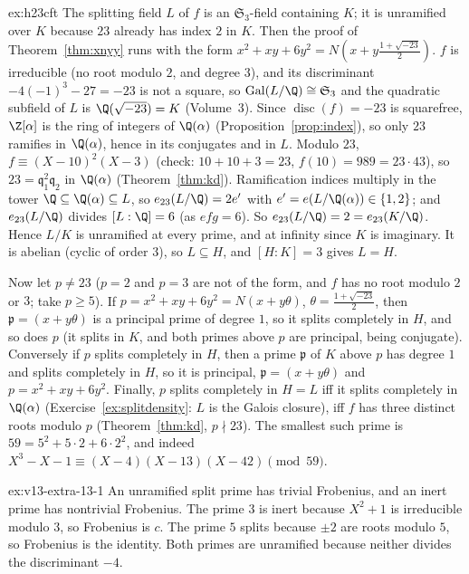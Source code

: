 \begin{solution}{ex:h23cft}
\idea The splitting field $L$ of $f$ is an $\mathfrak S_3$-field containing $K$; it is unramified over $K$ because $23$ already has index $2$ in $K$. Then the proof of
Theorem~\ref{thm:xnyy} runs with the form $x^2+xy+6y^2=N(x+y\frac{1+\sqrt{-23}}2)$.
\writeup $f$ is irreducible (no root modulo $2$, and degree $3$), and its discriminant $-4(-1)^3-27=-23$ is not a square, so $\operatorname{Gal}(L/\Q)\cong\mathfrak S_3$ and the
quadratic subfield of $L$ is $\Q(\sqrt{-23})=K$ (Volume~3). Since $\operatorname{disc}(f)=-23$ is squarefree, $\Z[\alpha]$ is the ring of integers of $\Q(\alpha)$ (Proposition~\ref{prop:index}),
so only $23$ ramifies in $\Q(\alpha)$, hence in its conjugates and in $L$. Modulo $23$, $f\equiv(X-10)^2(X-3)$ (check: $10+10+3=23$, $f(10)=989=23\cdot43$), so
$23=\mathfrak q_1^2\mathfrak q_2$ in $\Q(\alpha)$ (Theorem~\ref{thm:kd}). Ramification indices multiply in the tower $\Q\subseteq\Q(\alpha)\subseteq L$, so
$e_{23}(L/\Q)=2e'$ with $e'=e(L/\Q(\alpha))\in\{1,2\}$; and $e_{23}(L/\Q)$ divides $[L:\Q]=6$ (as $efg=6$). So $e_{23}(L/\Q)=2=e_{23}(K/\Q)$.
Hence $L/K$ is unramified at every prime, and at infinity since $K$ is imaginary. It is abelian (cyclic of order $3$), so $L\subseteq H$, and $[H:K]=3$ gives $L=H$.

Now let $p\ne23$ ($p=2$ and $p=3$ are not of the form, and $f$ has no root modulo $2$ or $3$; take $p\ge5$). If $p=x^2+xy+6y^2=N(x+y\theta)$, $\theta=\frac{1+\sqrt{-23}}2$,
then $\mathfrak p=(x+y\theta)$ is a principal prime of degree $1$, so it splits completely in $H$, and so does $p$ (it splits in $K$, and both primes above $p$ are principal,
being conjugate). Conversely if $p$ splits completely in $H$, then a prime $\mathfrak p$ of $K$ above $p$ has degree $1$ and splits completely in $H$, so it is principal,
$\mathfrak p=(x+y\theta)$ and $p=x^2+xy+6y^2$. Finally, $p$ splits completely in $H=L$ iff it splits completely in $\Q(\alpha)$ (Exercise~\ref{ex:splitdensity}: $L$ is the
Galois closure), iff $f$ has three distinct roots modulo $p$ (Theorem~\ref{thm:kd}, $p\nmid23$). The smallest such prime is $59=5^2+5\cdot2+6\cdot2^2$, and indeed
$X^3-X-1\equiv(X-4)(X-13)(X-42)\pmod{59}$.
\end{solution}

\begin{solution}{ex:v13-extra-13-1}
\idea An unramified split prime has trivial Frobenius, and an inert prime has nontrivial Frobenius.
\writeup The prime $3$ is inert because $X^2+1$ is irreducible modulo $3$, so Frobenius is $c$. The prime $5$ splits because $\pm2$ are roots modulo $5$, so Frobenius is the identity. Both primes are unramified because neither divides the discriminant $-4$.
\end{solution}

